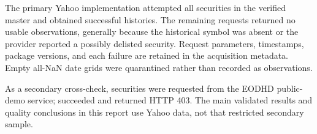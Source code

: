 
The primary Yahoo implementation attempted all \YahooAttempted{} securities in the verified master and obtained \YahooSuccess{} successful histories. The remaining \YahooFailed{} requests returned no usable observations, generally because the historical symbol was absent or the provider reported a possibly delisted security. Request parameters, timestamps, package versions, and each failure are retained in the acquisition metadata. Empty all-NaN date grids were quarantined rather than recorded as observations.

As a secondary cross-check, \DemoSelected{} securities were requested from the EODHD public-demo service; \DemoSuccess{} succeeded and \DemoFailed{} returned HTTP 403. The main validated results and quality conclusions in this report use Yahoo data, not that restricted secondary sample.
